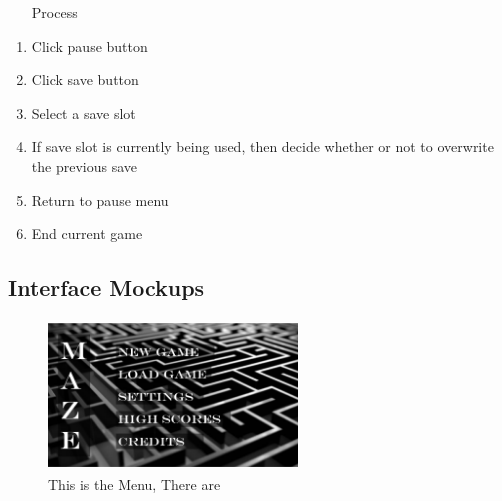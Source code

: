 \documentclass[10pt,conference,onecolumn,compsoc]{IEEEtran}
\begin{document}
\begin{itemize}
\begin{itemize}
\item [Process]
\end{itemize}
\begin{enumerate}
\item Click pause button
\item Click save button
\item Select a save slot
\item If save slot is currently being used, then decide whether or not to overwrite the previous save
\item Return to pause menu
\item End current game

\end{enumerate}

\end{itemize}
\subsection{Interface Mockups}

\begin{figure}[ht!]
\includegraphics[height=150px, width=250px]{interface/Interface-Menu.png}
\caption{This is the Menu, There are}
\label{Menu}
\end{figure}
\end{document}
